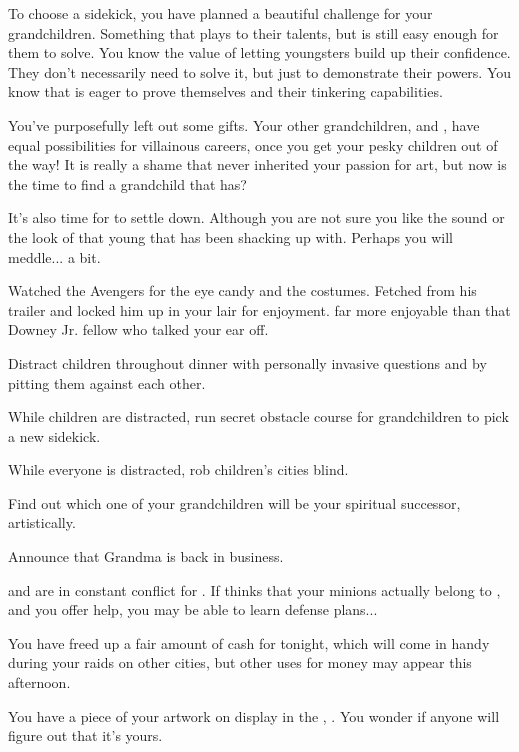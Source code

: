 \documentclass[char]{LRSguildcamp1}
\begin{document}
To choose a sidekick, you have planned a beautiful challenge for your grandchildren. Something that plays to their talents, but is still easy enough for them to solve. You know the value of letting youngsters build up their confidence. They don't necessarily need to solve it, but just to demonstrate their powers. You know that \cTeen{} is eager to prove themselves and their tinkering capabilities. 

You've purposefully left out some gifts. Your other grandchildren, \cGrad{} and \cTween{}, have equal possibilities for villainous careers, once you get your pesky children out of the way! It is really a shame that \cYoungest {} never inherited your passion for art, but now is the time to find a grandchild that has? 

It's also time for \cYoungest {} to settle down. Although you are not sure you like the sound or the look of that young \cYS{\hero} that \cYoungest{} has been shacking up with. Perhaps you will meddle... a bit. 

Watched the Avengers for the eye candy and the costumes. Fetched \cChrisHemsworth{\intro} from his trailer and locked him up in your lair for enjoyment. \cChrisHemsworth{\Theyare} far more enjoyable than that Downey Jr. fellow who talked your ear off. 

\begin{itemz}[Goals]
	\item Distract children throughout dinner with personally invasive questions and by pitting them against each other. 
	\item While children are distracted, run secret obstacle course for grandchildren to pick a new sidekick. 
	\item While everyone is distracted, rob children's cities blind. 
	\item Find out which one of your grandchildren will be your spiritual successor, artistically. 
	\item Announce that Grandma is back in business. 
	
\end{itemz}

\begin{itemz}[Notes]

	\item \cOldest{} and \cOS{} are in constant conflict for \pCityO{}.  If \cOldest{} thinks that your minions actually belong to \cOS{}, and you offer help, you may be able to learn \cOldest{\their} defense plans...
	\item You have freed up a fair amount of cash for tonight, which will come in handy during your raids on other cities, but other uses for money may appear this afternoon.
	
	\item You have a piece of your artwork on display in the \sArtRoom{}, \iArtworkTwo{}. You wonder if anyone will figure out that it's yours. 

\end{itemz}
\end{document}
